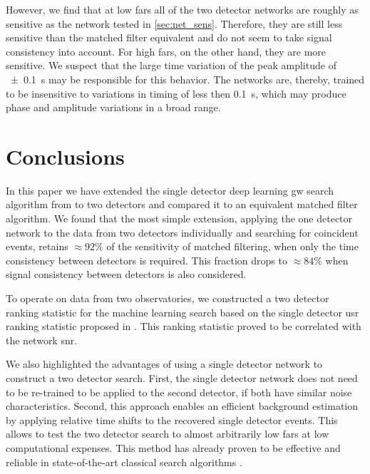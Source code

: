 However, we find that at low \acrshort{far}s all of the two detector networks are roughly as sensitive as the network tested in \autoref{sec:net_sens}. Therefore, they are still less sensitive than the matched filter equivalent and do not seem to take signal consistency into account. For high \acrshort{far}s, on the other hand, they are more sensitive. We suspect that the large time variation of the peak amplitude of \SI[parse-numbers=false]{\pm 0.1}{\second} may be responsible for this behavior. The networks are, thereby, trained to be insensitive to variations in timing of less then \SI{0.1}{\second}, which may produce phase and amplitude variations in a broad range.

\section{Conclusions}\label{sec:cnn_coinc_conclusions}
In this paper we have extended the single detector deep learning \acrshort{gw} search algorithm from \cite{Gabbard:2017lja, Schafer:2021fea} to two detectors and compared it to an equivalent matched filter algorithm. We found that the most simple extension, applying the one detector network to the data from two detectors individually and searching for coincident events, retains $\approx 92\%$ of the sensitivity of matched filtering, when only the time consistency between detectors is required. This fraction drops to $\approx 84\%$ when signal consistency between detectors is also considered.

To operate on data from two observatories, we constructed a two detector ranking statistic for the machine learning search based on the single detector \acrshort{usr} ranking statistic proposed in \cite{Schafer:2021fea}. This ranking statistic proved to be correlated with the network \acrshort{snr}.

We also highlighted the advantages of using a single detector network to construct a two detector search. First, the single detector network does not need to be re-trained to be applied to the second detector, if both have similar noise characteristics. Second, this approach enables an efficient background estimation by applying relative time shifts to the recovered single detector events. This allows to test the two detector search to almost arbitrarily low \acrshort{far}s at low computational expenses. This method has already proven to be effective and reliable in state-of-the-art classical search algorithms \cite{LIGOScientific:2020ibl, Usman:2015kfa, Sachdev:2019vvd}.

